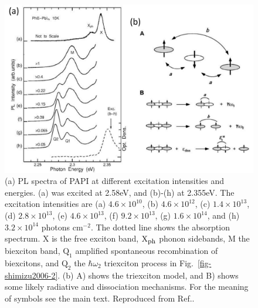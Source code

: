 \begin{figure}[h!]
\centering
\includegraphics[width=\textwidth]{Fig16}
\caption{(a) PL spectra of PAPI at different excitation intensities and energies. (a) was excited at 2.58eV, and (b)-(h) at 2.355eV. The excitation intensities are (a) $4.6\times 10^{10}$, (b) $4.6\times 10^{12}$, (c) $1.4\times 10^{13}$, (d) $2.8\times 10^{13}$, (e) $4.6\times 10^{13}$, (f) $9.2\times 10^{13}$, (g) $1.6\times 10^{14}$, and (h) $3.2\times 10^{14}$ photons c$\textrm{m}^{-2}$. The dotted line shows the absorption spectrum. X is the free exciton band, $\textrm{X}_{\textrm{\footnotesize ph}}$ phonon sidebands, M the biexciton band, $\textrm{Q}_1$ amplified spontaneous recombination of biexcitons, and $\textrm{Q}_2$ the $\hbar \omega_2$ triexciton process in Fig.\ \ref{fig-shimizu2006-2}. (b) A) shows the triexciton model, and B) shows some likely radiative and dissociation mechanisms. For the meaning of symbols see the main text. Reproduced from Ref.\cite{Shimizu2006a}.}
\label{2Fig16}
\end{figure}

